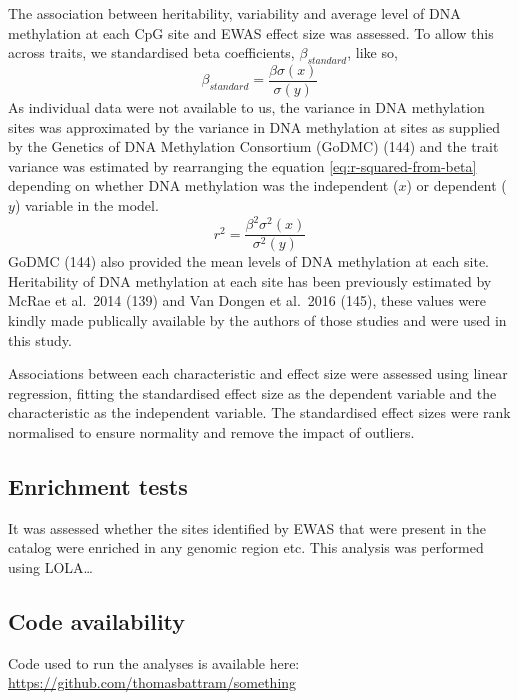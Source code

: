 \documentclass[11pt,oneside]{bristolthesis}
\begin{document}
The association between heritability, variability and average level of DNA methylation at each CpG site and EWAS effect size was assessed. To allow this across traits, we standardised beta coefficients, \(\beta_{standard}\), like so,
\begin{equation}
    \beta_{standard} = \frac{\beta\sigma(x)} {\sigma(y)}
    \label{eq:standardised-beta-coeffs}
\end{equation}
As individual data were not available to us, the variance in DNA methylation sites was approximated by the variance in DNA methylation at sites as supplied by the Genetics of DNA Methylation Consortium (GoDMC) (144) and the trait variance was estimated by rearranging the equation \eqref{eq:r-squared-from-beta} depending on whether DNA methylation was the independent (\(x\)) or dependent (\(y\)) variable in the model.
\begin{equation}
    r^2 = \frac{\beta^2\sigma^2(x)} {\sigma^2(y)}
    \label{eq:r-squared-from-beta}
\end{equation}
GoDMC (144) also provided the mean levels of DNA methylation at each site. Heritability of DNA methylation at each site has been previously estimated by McRae et al.~2014 (139) and Van Dongen et al.~2016 (145), these values were kindly made publically available by the authors of those studies and were used in this study.

Associations between each characteristic and effect size were assessed using linear regression, fitting the standardised effect size as the dependent variable and the characteristic as the independent variable. The standardised effect sizes were rank normalised to ensure normality and remove the impact of outliers.

\hypertarget{enrichment-tests}{%
\subsection{Enrichment tests}\label{enrichment-tests}}

It was assessed whether the sites identified by EWAS that were present in the catalog were enriched in any genomic region etc. This analysis was performed using LOLA\ldots{}

\hypertarget{code-availability-04}{%
\subsection{Code availability}\label{code-availability-04}}

Code used to run the analyses is available here: \url{https://github.com/thomasbattram/something}
\end{document}
